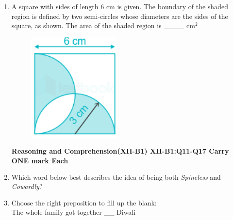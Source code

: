 \documentclass[12pt]{article}
\theoremstyle{remark}
\begin{document}
\begin{enumerate}
\item A square with sides of length 6 cm is given. The boundary of the shaded region is defined by two semi-circles whose diameters are the sides of the square, as shown. The area of the shaded region is \_\_\_\_ cm$^2$
\begin{figure}[H]
\centering
\includegraphics{Figs/Q10.png}\\
\caption{}
\label{Fig:1.3}
\end{figure} 
\begin{enumerate}  \end{enumerate}
\hfill{}
\newpage
\textbf{Reasoning and Comprehension(XH-B1)\newline 
XH-B1:Q11-Q17 Carry ONE mark Each}
\item  Which word below best describes the idea of being both \textit{Spineless} and \textit{Cowardly}?\\ 
\begin{enumerate}  \end{enumerate}
\hfill{}
\item   Choose the right preposition to fill up the blank: \\
 The whole family got together \_\_ Diwali \\ 
 \begin{enumerate} 
\end{enumerate}
\end{enumerate}
\end{document}

